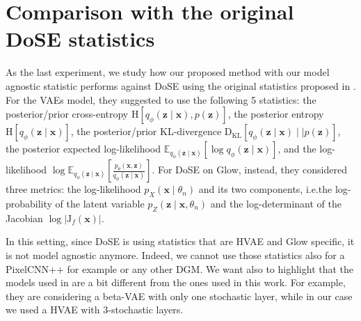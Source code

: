 {\section{Comparison with the original DoSE statistics}
As the last experiment, we study how our proposed method with our model agnostic statistic performs against DoSE using the original statistics proposed in \parencite{morningstar_density_2021}. For the VAEs model, they suggested to use the following 5 statistics: the posterior/prior cross-entropy $\text{H}[q_{\phi}( \textbf{z}\mid \textbf{x}), p(\textbf{z})]$, the posterior entropy $\text{H}[q_{\phi}(\textbf{z}\mid \textbf{x})]$, the posterior/prior KL-divergence $\text{D}_{\text{KL}}[q_{\phi}(\textbf{z}\mid \textbf{x}) \mid \mid p(\textbf{z})]$, the posterior expected log-likelihood $\mathbb{E}_{q_{\phi}(\textbf{z}\mid \textbf{x})}[\log q_{\phi}(\textbf{z}\mid \mathbf{x})]$, and the log-likelihood $\log \mathbb{E}_{q_{\phi}(\textbf{z}\mid \textbf{x})} \left[ \frac{p_{\theta}(\textbf{x}, \textbf{z})}{q_{\phi}(\textbf{z}\mid \textbf{x})}\right]$. For DoSE on Glow, instead, they considered three metrics: the log-likelihood $p_{X}(\textbf{x}\mid \theta_n)$ and its two components, i.e.\@ the log-probability of the latent variable $p_{Z}(\textbf{z}\mid \textbf{x}, \theta_n)$ and the log-determinant of the Jacobian $\log | \text{J}_{f}(\textbf{x})|$. 

In this setting, since DoSE is using statistics that are HVAE and Glow specific, it is not model agnostic anymore. Indeed, we cannot use those statistics also for a PixelCNN++ for example or any other DGM. We want also to highlight that the models used in \parencite{morningstar_density_2021} are a bit different from the ones used in this work. For example, they are considering a beta-VAE with only one stochastic layer, while in our case we used a HVAE with 3-stochastic layers. 




}
